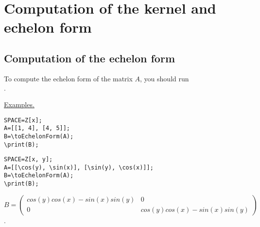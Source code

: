 \section{Computation of the kernel and echelon form}  

\subsection{Computation of the echelon form}  
To compute the echelon form of the matrix $A$, you should run\\
. 

\underline{Examples. }

\vspace*{-2mm}
\begin{verbatim}
SPACE=Z[x]; 
A=[[1, 4], [4, 5]];
B=\toEchelonForm(A); 
\print(B);
\end{verbatim}


\begin{verbatim}
SPACE=Z[x, y]; 
A=[[\cos(y), \sin(x)], [\sin(y), \cos(x)]];
B=\toEchelonForm(A); 
\print(B);
\end{verbatim}

{$B =\left(\begin{array}{cc} cos(y) cos(x)- sin(x) sin(y) &0\\ 0 & cos(y) cos(x)- sin(x) sin(y) \end{array}\right)$.} 
 
